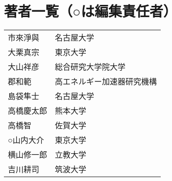 \newpage
\section*{著者一覧（○は編集責任者）}
\begin{tabular}{ll}
\noalign{\smallskip}
市來淨與 & 名古屋大学 \\
大栗真宗 & 東京大学 \\
大山祥彦 & 総合研究大学院大学 \\
郡和範   & 高エネルギー加速器研究機構 \\
島袋隼士 & 名古屋大学 \\
高橋慶太郎 & 熊本大学 \\
高橋智 & 佐賀大学 \\
○山内大介 & 東京大学 \\
横山修一郎 & 立教大学 \\
吉川耕司 & 筑波大学
\end{tabular}
